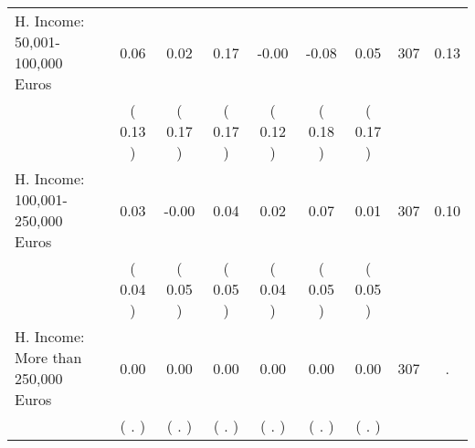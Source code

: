 \begin{tabular}{lcccccccc}
H. Income: 50,001-100,000 Euros &      0.06 &      0.02 &      0.17 &     -0.00 &     -0.08 &      0.05 & 307 &       0.13 \\ 
 & (     0.13 ) & (     0.17 ) & (     0.17 ) & (     0.12 ) & (     0.18 ) & (     0.17 ) & \\
H. Income: 100,001-250,000 Euros &      0.03 &     -0.00 &      0.04 &      0.02 &      0.07 &      0.01 & 307 &       0.10 \\ 
 & (     0.04 ) & (     0.05 ) & (     0.05 ) & (     0.04 ) & (     0.05 ) & (     0.05 ) & \\
H. Income: More than 250,000 Euros &      0.00 &      0.00 &      0.00 &      0.00 &      0.00 &      0.00 & 307 &          . \\ 
 & (        . ) & (        . ) & (        . ) & (        . ) & (        . ) & (        . ) & \\
\bottomrule
\end{tabular}
